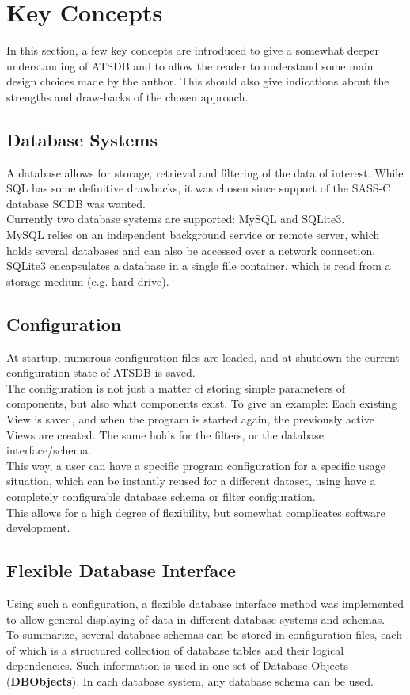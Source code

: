 \section{Key Concepts}
\label{sec:key_concepts}

In this section, a few key concepts are introduced to give a somewhat deeper understanding of ATSDB and to allow the reader to understand some main design choices made by the author. This should also give indications about the strengths and draw-backs of the chosen approach.

\subsection*{Database Systems}
A database allows for storage, retrieval and filtering of the data of interest. While SQL has some definitive drawbacks, it was chosen since support of the SASS-C database SCDB was wanted.\\
Currently  two  database  systems  are  supported: MySQL and SQLite3. \\
MySQL  relies on an independent background service or remote server, which holds several databases and can also be accessed over a network connection.\\
SQLite3 encapsulates a database in a single file container, which is read from a storage medium (e.g. hard drive).

\subsection*{Configuration}
At startup, numerous configuration files are loaded, and at shutdown the current configuration state of ATSDB is saved.\\
The configuration is not just a matter of storing simple parameters of components, but also what components exist. To give an example: Each existing View is saved, and when the program is started again, the previously active Views are created.  The same holds for the filters, or the database interface/schema. \\
This way, a user can have a specific program configuration for a specific usage situation, which can be instantly reused for a different dataset, using have a completely configurable database schema or filter configuration. \\
This allows for a high degree of flexibility, but somewhat complicates software development.

\subsection*{Flexible Database Interface}
Using such a configuration, a flexible database interface method was implemented to allow general displaying of data in different database systems and schemas.\\
To summarize, several database schemas can be stored in configuration files, each of which is a structured collection of database tables and their logical dependencies. Such information is used in one set of Database Objects (\textbf{DBObjects}). In each database system, any database schema can be used.

